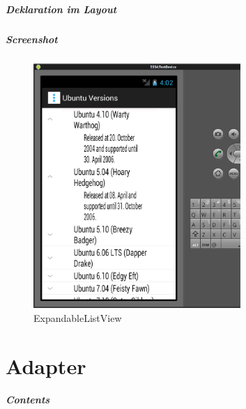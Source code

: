 \begin{frame}
   \frametitle{Deklaration im Layout}
   
\end{frame}

\begin{frame}
   \frametitle{Screenshot}
   \begin{figure}[h!]
     \centering
     \includegraphics[width=0.7\textwidth]{pictures/explistview.ps}
     \caption{
        ExpandableListView
     }
     \label{fig:explistview}
   \end{figure}
\end{frame}

\part{Adapter}
\frame{\partpage}
\begin{frame}
	\frametitle{Contents}
	\tableofcontents[]
\end{frame}

